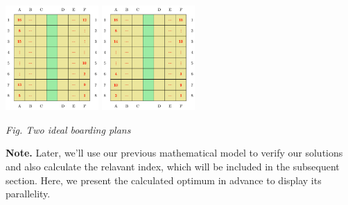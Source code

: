 \documentclass{article}
\theoremstyle{definition}
\theoremstyle{remark}
\numberwithin{equation}{section}
\begin{document}
	\begin{center}
		\includegraphics[height =4cm]{steffen1.jpg}
		\includegraphics[height = 4cm]{steffen2.jpg}

		\small\textit{Fig. Two ideal boarding plans}
	\end{center}

	\textbf{Note. }Later, we'll use our previous mathematical model to verify our solutions and also calculate the relavant  index, which will be included in the subsequent section. Here, we present the calculated optimum in advance to display its parallelity.
\end{document}
